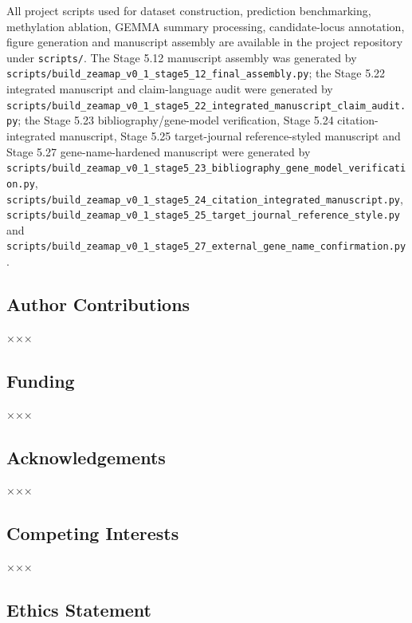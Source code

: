 \documentclass[
]{article}
\begin{document}
All project scripts used for dataset construction, prediction
benchmarking, methylation ablation, GEMMA summary processing,
candidate-locus annotation, figure generation and manuscript assembly
are available in the project repository under \texttt{scripts/}. The
Stage 5.12 manuscript assembly was generated by
\texttt{scripts/build\_zeamap\_v0\_1\_stage5\_12\_final\_assembly.py};
the Stage 5.22 integrated manuscript and claim-language audit were
generated by
\texttt{scripts/build\_zeamap\_v0\_1\_stage5\_22\_integrated\_manuscript\_claim\_audit.py};
the Stage 5.23 bibliography/gene-model verification, Stage 5.24
citation-integrated manuscript, Stage 5.25 target-journal
reference-styled manuscript and Stage 5.27 gene-name-hardened manuscript
were generated by
\texttt{scripts/build\_zeamap\_v0\_1\_stage5\_23\_bibliography\_gene\_model\_verification.py},
\texttt{scripts/build\_zeamap\_v0\_1\_stage5\_24\_citation\_integrated\_manuscript.py},
\texttt{scripts/build\_zeamap\_v0\_1\_stage5\_25\_target\_journal\_reference\_style.py}
and
\texttt{scripts/build\_zeamap\_v0\_1\_stage5\_27\_external\_gene\_name\_confirmation.py}.

\subsection{Author Contributions}\label{author-contributions}

×××

\subsection{Funding}\label{funding}

×××

\subsection{Acknowledgements}\label{acknowledgements}

×××

\subsection{Competing Interests}\label{competing-interests}

×××

\subsection{Ethics Statement}\label{ethics-statement}
\end{document}
